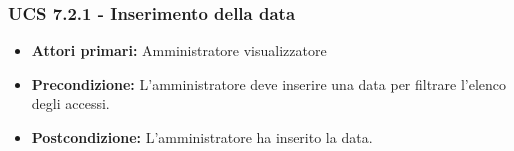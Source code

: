 \subsubsection{UCS 7.2.1 - Inserimento della data }
\begin{itemize}
	\item \textbf{Attori primari:} Amministratore visualizzatore
	\item \textbf{Precondizione:} L'amministratore deve inserire una data per filtrare l'elenco degli accessi.
	\item \textbf{Postcondizione:} L'amministratore ha inserito la data.
\end{itemize}




